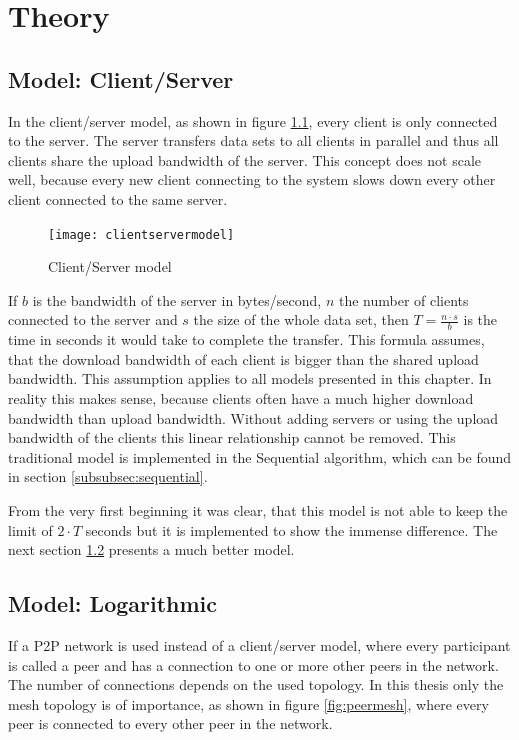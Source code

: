 \chapter{Theory}
\label{ch:theory}

\section{Model: Client/Server}
In the client/server model, as shown in figure \ref{fig:clientservermodel}, every client is only connected to the server. The server transfers data sets to all clients in parallel and thus all clients share the upload bandwidth of the server. This concept does not scale well, because every new client connecting to the system slows down every other client connected to the same server. 

\begin{figure}[H]
\centering
\texttt{[image: clientservermodel]}
\caption{Client/Server model}
\label{fig:clientservermodel}
\end{figure}

If $b$ is the bandwidth of the server in bytes/second, $n$ the number of clients connected to the server and $s$ the size of the whole data set, then $T=\frac{n \cdot s}{b}$ is the time in seconds it would take to complete the transfer. This formula assumes, that the download bandwidth of each client is bigger than the shared upload bandwidth. This assumption applies to all models presented in this chapter. In reality this makes sense, because clients often have a much higher download bandwidth than upload bandwidth. Without adding servers or using the upload bandwidth of the clients this linear relationship cannot be removed. This traditional model is implemented in the Sequential algorithm, which can be found in section \ref{subsubsec:sequential}.

From the very first beginning it was clear, that this model is not able to keep the limit of $2 \cdot T$ seconds but it is implemented to show the immense difference. The next section \ref{subsubsec:logarithmicmodel} presents a much better model.

\pagebreak
\section{Model: Logarithmic}
\label{subsubsec:logarithmicmodel}
If a P2P network is used instead of a client/server model, where every participant is called a peer and has a connection to one or more other peers in the network. The number of connections depends on the used topology. In this thesis only the mesh topology is of importance, as shown in figure \ref{fig:peermesh}, where every peer is connected to every other peer in the network. 

